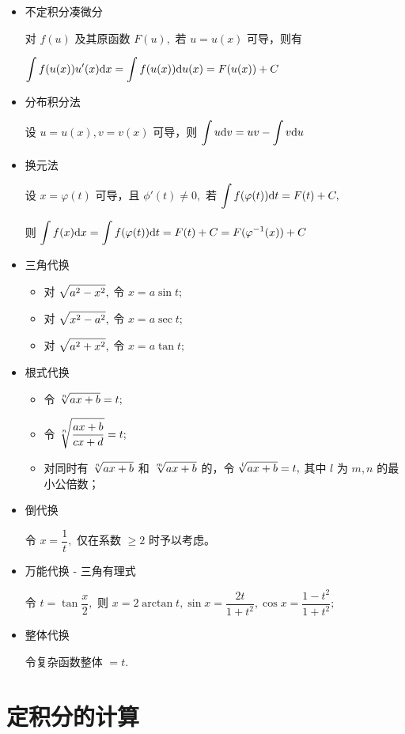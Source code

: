 \begin{itemize}
    \item 不定积分凑微分
    
    对 $ f(u) $ 及其原函数 $ F(u), $ 若 $ u = u(x) $ 可导，则有
    
    $ \displaystyle \int f(u(x))u'(x)\mathrm{d}x = \int f(u(x))\mathrm{d}u(x) = F(u(x)) + C $ 
    \item 分布积分法
    
    设 $ u = u(x), v = v(x) $ 可导，则 $ \displaystyle \int u\mathrm{d}v = uv - \int v\mathrm{d}u $ 
    \item 换元法
    
    设 $ x = \varphi(t) $ 可导，且 $ \phi'(t) \neq 0, $ 
    若 $ \displaystyle \int f(\varphi(t))\mathrm{d}t = F(t) + C, $

    则 $ \displaystyle \int f(x)\mathrm{d}x = \int f(\varphi(t))\mathrm{d}t = F(t) + C = F(\varphi^{-1}(x)) + C $ 
    \item 三角代换
    \begin{itemize}
        \item 对 $ \displaystyle\sqrt{a^2 - x^2}, $ 令 $ x = a\sin t; $ 
        \item 对 $ \displaystyle\sqrt{x^2 - a^2}, $ 令 $ x = a\sec t; $ 
        \item 对 $ \displaystyle\sqrt{a^2 + x^2}, $ 令 $ x = a\tan t; $ 
    \end{itemize}
    \item 根式代换
    \begin{itemize}
        \item 令 $ \displaystyle\sqrt[n]{ax+b} = t; $ 
        \item 令 $ \displaystyle\sqrt[n]{\dfrac{ax+b}{cx+d}} = t; $ 
        \item 对同时有 $ \displaystyle\sqrt[n]{ax+b} $ 和 $ \displaystyle\sqrt[m]{ax+b} $ 的，令
        $ \displaystyle\sqrt[l]{ax+b} = t, $ 其中 $ l $ 为 $ m,n $ 的最小公倍数；
    \end{itemize}
    \item 倒代换
    
    令 $ x = \dfrac{1}{t}, $ 仅在系数 $ \geq 2 $ 时予以考虑。
    \item 万能代换 - 三角有理式
    
    令 $ t = \tan \dfrac{x}{2}, $ 则 $ x = 2\arctan t, \sin x = \dfrac{2t}{1+t^2}, 
    \cos x = \dfrac{1-t^2}{1+t^2}; $
    \item 整体代换
    
    令复杂函数整体 $  = t. $ 
\end{itemize}

\section{定积分的计算}

